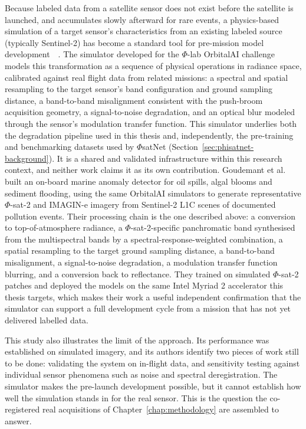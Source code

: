 Because labeled data from a satellite sensor does not exist before the satellite is launched, and accumulates slowly afterward for rare events, a physics-based simulation of a target sensor's characteristics from an existing labeled source (typically Sentinel-2) has become a standard tool for pre-mission model development~\cite{segl2012eetes}~\cite{segl2015s2etes}.
The simulator developed for the  $\Phi$-lab OrbitalAI challenge~\cite{longepe2024orbitalai} models this transformation as a sequence of physical operations in radiance space, calibrated against real flight data from related missions: a spectral and spatial resampling to the target sensor's band configuration and ground sampling distance, a band-to-band misalignment consistent with the push-broom acquisition geometry, a signal-to-noise degradation, and an optical blur modeled through the sensor's modulation transfer function.
This simulator underlies both the degradation pipeline used in this thesis and, independently, the pre-training and benchmarking datasets used by $\Phi$satNet (Section~\ref{sec:phisatnet-background}).
It is a shared and validated infrastructure within this research context, and neither work claims it as its own contribution.
Goudemant et al.~\cite{goudemant2024onboardanomaly} built an on-board marine anomaly detector for oil spills, algal blooms and sediment flooding, using the same OrbitalAI simulators to generate representative $\Phi$-sat-2 and IMAGIN-e imagery from Sentinel-2 L1C scenes of documented pollution events.
Their processing chain is the one described above: a conversion to top-of-atmosphere radiance, a $\Phi$-sat-2-specific panchromatic band synthesised from the multispectral bands by a spectral-response-weighted combination, a spatial resampling to the target ground sampling distance, a band-to-band misalignment, a signal-to-noise degradation, a modulation transfer function blurring, and a conversion back to reflectance.
They trained on simulated $\Phi$-sat-2 patches and deployed the models on the same Intel Myriad 2 accelerator this thesis targets, which makes their work a useful independent confirmation that the simulator can support a full development cycle from a mission that has not yet delivered labelled data.

This study also illustrates the limit of the approach.
Its performance was established on simulated imagery, and its authors identify two pieces of work still to be done: validating the system on in-flight data, and sensitivity testing against individual sensor phenomena such as noise and spectral deregistration.
The simulator makes the pre-launch development possible, but it cannot establish how well the simulation stands in for the real sensor.
This is the question the co-registered real acquisitions of Chapter~\ref{chap:methodology} are assembled to answer.

